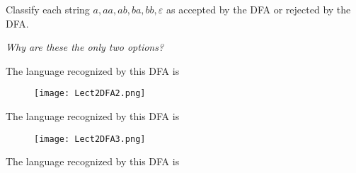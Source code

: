 \documentclass[12pt, oneside]{article}
\begin{document}
\vspace{100pt}
   

Classify each string $a, aa, ab, ba, bb, \varepsilon$ as accepted by the DFA or rejected by the DFA.  

{\it Why are these the only two options?}

\vspace{200pt}


The language recognized by this DFA is
  
\vspace{100pt}
   

\begin{figure}[h]
  \centering
  \texttt{[image: Lect2DFA2.png]} 
\end{figure}
   

The language recognized by this DFA is
  
\vspace{100pt}

\begin{figure}[h]
    \centering
    \texttt{[image: Lect2DFA3.png]} 
\end{figure}

The language recognized by this DFA is
  
\vspace{100pt}
 \vfill
\end{document}
